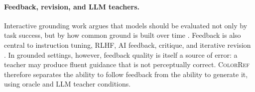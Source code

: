 \documentclass[11pt]{article}
\begin{document}
\paragraph{Feedback, revision, and LLM teachers.}
Interactive grounding work argues that models should be evaluated not only by
task success, but by how common ground is built over time
\citep{imai2025measuring}. Feedback is also central to instruction tuning,
RLHF, AI feedback, critique, and iterative revision
\citep{ouyang2022training,bai2022constitutional,
saunders2022selfcritiquing,madaan2023selfrefine,shinn2023reflexion}. In
grounded settings, however, feedback quality is itself a source of error: a
teacher may produce fluent guidance that is not perceptually correct.
\textsc{ColorRef} therefore separates the ability to follow feedback from
the ability to generate it, using oracle and LLM teacher conditions.




\end{document}
